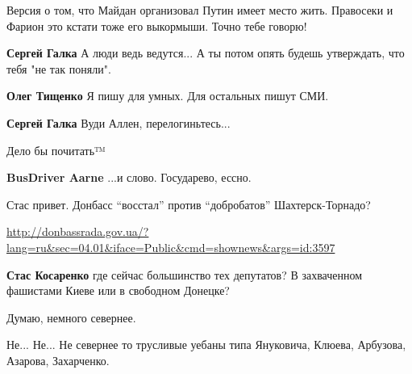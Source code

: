 \begin{itemize}
Версия о том, что Майдан организовал Путин имеет место жить. Правосеки и Фарион
это кстати тоже его выкормыши. Точно тебе говорю!

\begin{itemize} %
\textbf{Сергей Галка}
А люди ведь ведутся...
А ты потом опять будешь утверждать, что тебя "не так поняли".

\textbf{Олег Тищенко} Я пишу для умных. Для остальных пишут СМИ.

\textbf{Сергей Галка}
Вуди Аллен, перелогиньтесь...

Дело бы почитать™

\textbf{BusDriver Aarne}
...и слово. Государево, ессно.
\end{itemize} %


Стас привет. Донбасс \enquote{восстал} против \enquote{добробатов} Шахтерск-Торнадо?

\begin{itemize} %
\url{http://donbassrada.gov.ua/?lang=ru&sec=04.01&iface=Public&cmd=shownews&args=id:3597}

\textbf{Стас Косаренко} где сейчас большинство тех депутатов? В захваченном фашистами Киеве или в свободном Донецке?

Думаю, немного севернее.

Не... Не... Не севернее то трусливые уебаны типа Януковича, Клюева, Арбузова, Азарова, Захарченко.

\end{itemize} %

\end{itemize} %
